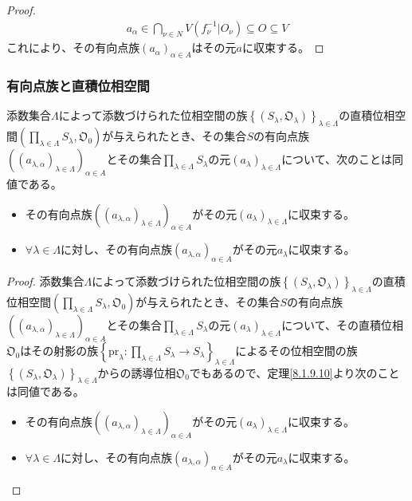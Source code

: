 \documentclass[dvipdfmx]{jsarticle}
\begin{document}
\begin{proof}
\begin{align*}
a_{\alpha} \in \bigcap_{\nu \in N } {V\left( f_{\nu}^{- 1}|O_{\nu} \right)} \subseteq O \subseteq V
\end{align*}
これにより、その有向点族$\left( a_{\alpha} \right)_{\alpha \in A}$はその元$a$に収束する。
\end{proof}
\subsubsection{有向点族と直積位相空間}%
\begin{thm}\label{8.1.9.11}
添数集合$\varLambda$によって添数づけられた位相空間の族$\left\{ \left( S_{\lambda},\mathfrak{O}_{\lambda} \right) \right\}_{\lambda \in \varLambda}$の直積位相空間$\left( \prod_{\lambda \in \varLambda} S_{\lambda},\mathfrak{O}_{0} \right)$が与えられたとき、その集合$S$の有向点族$\left( \left( a_{\lambda,\alpha} \right)_{\lambda \in \varLambda} \right)_{\alpha \in A}$とその集合$\prod_{\lambda \in \varLambda} S_{\lambda}$の元$\left( a_{\lambda} \right)_{\lambda \in \varLambda}$について、次のことは同値である。
\begin{itemize}
\item
  その有向点族$\left( \left( a_{\lambda,\alpha} \right)_{\lambda \in \varLambda} \right)_{\alpha \in A}$がその元$\left( a_{\lambda} \right)_{\lambda \in \varLambda}$に収束する。
\item
  $\forall\lambda \in \varLambda$に対し、その有向点族$\left( a_{\lambda,\alpha} \right)_{\alpha \in A}$がその元$a_{\lambda}$に収束する。
\end{itemize}
\end{thm}
\begin{proof}
添数集合$\varLambda$によって添数づけられた位相空間の族$\left\{ \left( S_{\lambda},\mathfrak{O}_{\lambda} \right) \right\}_{\lambda \in \varLambda}$の直積位相空間$\left( \prod_{\lambda \in \varLambda} S_{\lambda},\mathfrak{O}_{0} \right)$が与えられたとき、その集合$S$の有向点族$\left( \left( a_{\lambda,\alpha} \right)_{\lambda \in \varLambda} \right)_{\alpha \in A}$とその集合$\prod_{\lambda \in \varLambda} S_{\lambda}$の元$\left( a_{\lambda} \right)_{\lambda \in \varLambda}$について、その直積位相$\mathfrak{O}_{0}$はその射影の族$\left\{ {\mathrm{pr}}_{\lambda}:\prod_{\lambda \in \varLambda} S_{\lambda} \rightarrow S_{\lambda} \right\}_{\lambda \in \varLambda}$によるその位相空間の族$\left\{ \left( S_{\lambda},\mathfrak{O}_{\lambda} \right) \right\}_{\lambda \in \varLambda}$からの誘導位相$\mathfrak{O}_{0}$でもあるので、定理\ref{8.1.9.10}より次のことは同値である。
\begin{itemize}
\item
  その有向点族$\left( \left( a_{\lambda,\alpha} \right)_{\lambda \in \varLambda} \right)_{\alpha \in A}$がその元$\left( a_{\lambda} \right)_{\lambda \in \varLambda}$に収束する。
\item
  $\forall\lambda \in \varLambda$に対し、その有向点族$\left( a_{\lambda,\alpha} \right)_{\alpha \in A}$がその元$a_{\lambda}$に収束する。
\end{itemize}
\end{proof}
\end{document}
